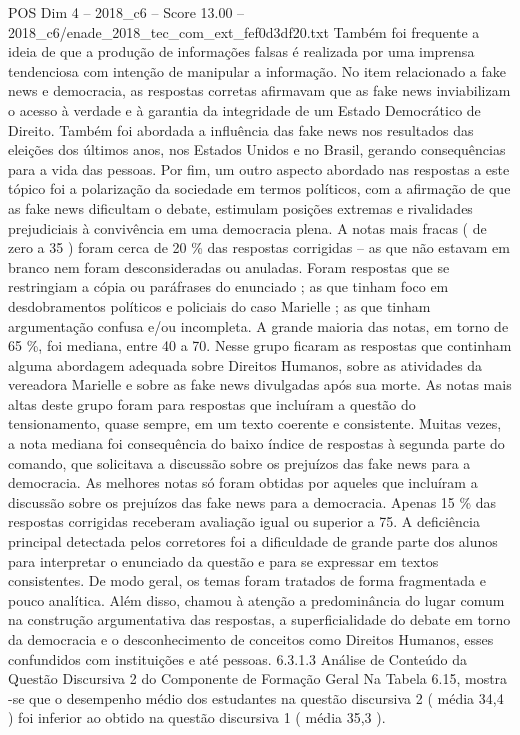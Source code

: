\begin{textsample}{POS Dim 4 – 2018\_c6 – Score 13.00 – 2018\_c6/enade\_2018\_tec\_com\_ext\_fef0d3df20.txt}
Também foi frequente a ideia de que a produção de informações falsas é realizada por uma imprensa tendenciosa com intenção de manipular a informação.
No item relacionado a fake news e democracia, as respostas corretas afirmavam que as fake news inviabilizam o acesso à verdade e à garantia da integridade de um Estado Democrático de Direito.
Também foi abordada a influência das fake news nos resultados das eleições dos últimos anos, nos Estados Unidos e no Brasil, gerando consequências para a vida das pessoas.
Por fim, um outro aspecto abordado nas respostas a este tópico foi a polarização da sociedade em termos políticos, com a afirmação de que as fake news dificultam o debate, estimulam posições extremas e rivalidades prejudiciais à convivência em uma democracia plena.
A notas mais fracas ( de zero a 35 ) foram cerca de 20 \% das respostas corrigidas – as que não estavam em branco nem foram desconsideradas ou anuladas.
Foram respostas que se restringiam a cópia ou paráfrases do enunciado ; as que tinham foco em desdobramentos políticos e policiais do caso Marielle ; as que tinham argumentação confusa e/ou incompleta.
A grande maioria das notas, em torno de 65 \%, foi mediana, entre 40 a 70.
Nesse grupo ficaram as respostas que continham alguma abordagem adequada sobre Direitos Humanos, sobre as atividades da vereadora Marielle e sobre as fake news divulgadas após sua morte.
As notas mais altas deste grupo foram para respostas que incluíram a questão do tensionamento, quase sempre, em um texto coerente e consistente.
Muitas vezes, a nota mediana foi consequência do baixo índice de respostas à segunda parte do comando, que solicitava a discussão sobre os prejuízos das fake news para a democracia.
As melhores notas só foram obtidas por aqueles que incluíram a discussão sobre os prejuízos das fake news para a democracia.
Apenas 15 \% das respostas corrigidas receberam avaliação igual ou superior a 75.
A deficiência principal detectada pelos corretores foi a dificuldade de grande parte dos alunos para interpretar o enunciado da questão e para se expressar em textos consistentes.
De modo geral, os temas foram tratados de forma fragmentada e pouco analítica.
Além disso, chamou à atenção a predominância do lugar comum na construção argumentativa das respostas, a superficialidade do debate em torno da democracia e o desconhecimento de conceitos como Direitos Humanos, esses confundidos com instituições e até pessoas. 6.3.1.3 Análise de Conteúdo da Questão Discursiva 2 do Componente de Formação Geral Na Tabela 6.15, mostra -se que o desempenho médio dos estudantes na questão discursiva 2 ( média 34,4 ) foi inferior ao obtido na questão discursiva 1 ( média 35,3 ).

\end{textsample}

